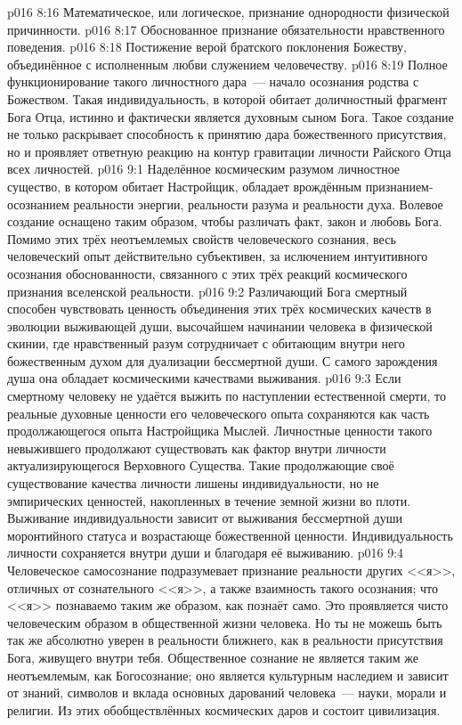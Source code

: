 \vs p016 8:16 Математическое, или логическое, признание однородности физической причинности.
\vs p016 8:17 Обоснованное признание обязательности нравственного поведения.
\vs p016 8:18 Постижение верой братского поклонения Божеству, объединённое с исполненным любви служением человечеству.
\vs p016 8:19 \pc Полное функционирование такого личностного дара~--- начало осознания родства с Божеством. Такая индивидуальность, в которой обитает доличностный фрагмент Бога Отца, истинно и фактически является духовным сыном Бога. Такое создание не только раскрывает способность к принятию дара божественного присутствия, но и проявляет ответную реакцию на контур гравитации личности Райского Отца всех личностей.
\vs p016 9:1 Наделённое космическим разумом личностное существо, в котором обитает Настройщик, обладает врождённым признанием\hyp{}осознанием реальности энергии, реальности разума и реальности духа. Волевое создание оснащено таким образом, чтобы различать факт, закон и любовь Бога. Помимо этих трёх неотъемлемых свойств человеческого сознания, весь человеческий опыт действительно субъективен, за ислючением интуитивного осознания обоснованности, связанного с  этих трёх реакций космического признания вселенской реальности.
\vs p016 9:2 Различающий Бога смертный способен чувствовать ценность объединения этих трёх космических качеств в эволюции выживающей души, высочайшем начинании человека в физической скинии, где нравственный разум сотрудничает с обитающим внутри него божественным духом для дуализации бессмертной души. С самого зарождения душа  она обладает космическими качествами выживания.
\vs p016 9:3 Если смертному человеку не удаётся выжить по наступлении естественной смерти, то реальные духовные ценности его человеческого опыта сохраняются как часть продолжающегося опыта Настройщика Мыслей. Личностные ценности такого невыжившего продолжают существовать как фактор внутри личности актуализирующегося Верховного Существа. Такие продолжающие своё существование качества личности лишены индивидуальности, но не эмпирических ценностей, накопленных в течение земной жизни во плоти. Выживание индивидуальности зависит от выживания бессмертной души моронтийного статуса и возрастающе божественной ценности. Индивидуальность личности сохраняется внутри души и благодаря её выживанию.
\vs p016 9:4 \pc Человеческое самосознание подразумевает признание реальности других <<я>>, отличных от сознательного <<я>>, а также взаимность такого осознания; что <<я>> познаваемо таким же образом, как познаёт само. Это проявляется чисто человеческим образом в общественной жизни человека. Но ты не можешь быть так же абсолютно уверен в реальности ближнего, как в реальности присутствия Бога, живущего внутри тебя. Общественное сознание не является таким же неотъемлемым, как Богосознание; оно является культурным наследием и зависит от знаний, символов и вклада основных дарований человека~--- науки, морали и религии. Из этих обобществлённых космических даров и состоит цивилизация.
